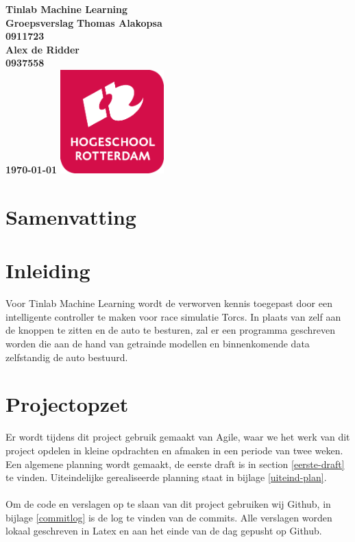 \documentclass{article}
\begin{document}
\sffamily
\begin{titlepage}
  \centering
    \vfill
    {\bfseries\Huge
      Tinlab Machine Learning \\
      Groepsverslag
        \vskip2cm
      }
      {\bfseries\Large
      	Thomas Alakopsa\\
      	{ \bfseries\normalsize
      	0911723\\
      	}
      }
      {\bfseries\Large
      	Alex de Ridder\\
      	{ \bfseries\normalsize
      	0937558\\
      	}
      }
      {
        \bfseries\normalsize
        \vskip2cm
        \today
    }    
    \vfill
    \includegraphics[width=4cm]{logohr.png}
    \vfill
    \vfill
\end{titlepage}
\newpage

\section{Samenvatting}



\section{Inleiding}
Voor Tinlab Machine Learning wordt de verworven kennis toegepast door een intelligente controller te maken voor race simulatie Torcs. In plaats van zelf aan de knoppen te zitten en de auto te besturen, zal er een programma geschreven worden die aan de hand van getrainde modellen en binnenkomende data zelfstandig de auto bestuurd. 


\section{Projectopzet}
Er wordt tijdens dit project gebruik gemaakt van Agile, waar we het werk van dit project opdelen in kleine opdrachten en afmaken in een periode van twee weken. Een algemene planning wordt gemaakt, de eerste draft is in section \ref{eerste-draft} te vinden. Uiteindelijke gerealiseerde planning staat in bijlage \ref{uiteind-plan}.\\\\
Om de code en verslagen op te slaan van dit project gebruiken wij Github, in bijlage \ref{commitlog} is de log te vinden van de commits. Alle verslagen worden lokaal geschreven in Latex en aan het einde van de dag gepusht op Github.
\end{document}
